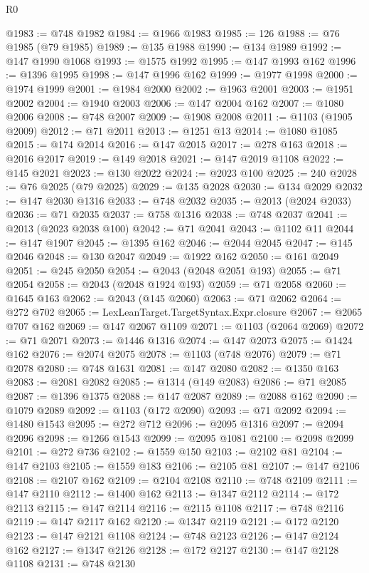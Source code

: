 \begin{lexlean}{R0}
\begin{coremodule}
@1983 := @748 @1982
@1984 := @1966 @1983
@1985 := 126
@1988 := @76 @1985 (@79 @1985)
@1989 := @135 @1988
@1990 := @134 @1989
@1992 := @147 @1990 @1068
@1993 := @1575 @1992
@1995 := @147 @1993 @162
@1996 := @1396 @1995
@1998 := @147 @1996 @162
@1999 := @1977 @1998
@2000 := @1974 @1999
@2001 := @1984 @2000
@2002 := @1963 @2001
@2003 := @1951 @2002
@2004 := @1940 @2003
@2006 := @147 @2004 @162
@2007 := @1080 @2006
@2008 := @748 @2007
@2009 := @1908 @2008
@2011 := @1103 (@1905 @2009)
@2012 := @71 @2011
@2013 := @1251 @13
@2014 := @1080 @1085
@2015 := @174 @2014
@2016 := @147 @2015
@2017 := @278 @163
@2018 := @2016 @2017
@2019 := @149 @2018
@2021 := @147 @2019 @1108
@2022 := @145 @2021
@2023 := @130 @2022
@2024 := @2023 @100
@2025 := 240
@2028 := @76 @2025 (@79 @2025)
@2029 := @135 @2028
@2030 := @134 @2029
@2032 := @147 @2030 @1316
@2033 := @748 @2032
@2035 := @2013 (@2024 @2033)
@2036 := @71 @2035
@2037 := @758 @1316
@2038 := @748 @2037
@2041 := @2013 (@2023 @2038 @100)
@2042 := @71 @2041
@2043 := @1102 @11
@2044 := @147 @1907
@2045 := @1395 @162
@2046 := @2044 @2045
@2047 := @145 @2046
@2048 := @130 @2047
@2049 := @1922 @162
@2050 := @161 @2049
@2051 := @245 @2050
@2054 := @2043 (@2048 @2051 @193)
@2055 := @71 @2054
@2058 := @2043 (@2048 @1924 @193)
@2059 := @71 @2058
@2060 := @1645 @163
@2062 := @2043 (@145 @2060)
@2063 := @71 @2062
@2064 := @272 @702
@2065 := LexLeanTarget.TargetSyntax.Expr.closure
@2067 := @2065 @707 @162
@2069 := @147 @2067 @1109
@2071 := @1103 (@2064 @2069)
@2072 := @71 @2071
@2073 := @1446 @1316
@2074 := @147 @2073
@2075 := @1424 @162
@2076 := @2074 @2075
@2078 := @1103 (@748 @2076)
@2079 := @71 @2078
@2080 := @748 @1631
@2081 := @147 @2080
@2082 := @1350 @163
@2083 := @2081 @2082
@2085 := @1314 (@149 @2083)
@2086 := @71 @2085
@2087 := @1396 @1375
@2088 := @147 @2087
@2089 := @2088 @162
@2090 := @1079 @2089
@2092 := @1103 (@172 @2090)
@2093 := @71 @2092
@2094 := @1480 @1543
@2095 := @272 @712
@2096 := @2095 @1316
@2097 := @2094 @2096
@2098 := @1266 @1543
@2099 := @2095 @1081
@2100 := @2098 @2099
@2101 := @272 @736
@2102 := @1559 @150
@2103 := @2102 @81
@2104 := @147 @2103
@2105 := @1559 @183
@2106 := @2105 @81
@2107 := @147 @2106
@2108 := @2107 @162
@2109 := @2104 @2108
@2110 := @748 @2109
@2111 := @147 @2110
@2112 := @1400 @162
@2113 := @1347 @2112
@2114 := @172 @2113
@2115 := @147 @2114
@2116 := @2115 @1108
@2117 := @748 @2116
@2119 := @147 @2117 @162
@2120 := @1347 @2119
@2121 := @172 @2120
@2123 := @147 @2121 @1108
@2124 := @748 @2123
@2126 := @147 @2124 @162
@2127 := @1347 @2126
@2128 := @172 @2127
@2130 := @147 @2128 @1108
@2131 := @748 @2130

\end{coremodule}
\end{lexlean}
